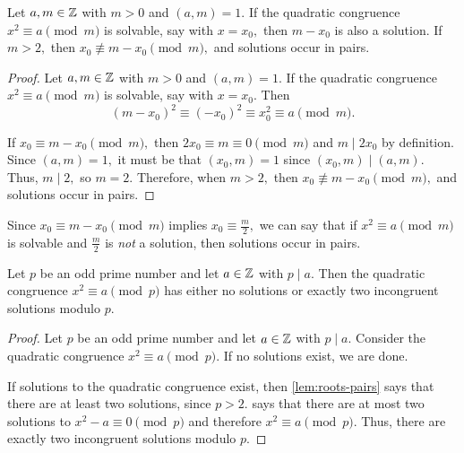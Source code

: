 \documentclass{ximera}
\begin{document}
\begin{lemma}\label{lem:roots-pairs}
    Let $a,m\in\mathbb Z$ with $m>0$ and $(a,m)=1.$ If the quadratic congruence $x^2\equiv a\pmod{m}$ is solvable, say with $x=x_0,$ then  $m-x_0$ is also a solution. If $m\gt 2,$ then $x_0\not\equiv m-x_0\pmod{m},$ and solutions occur in pairs.


    \begin{proof}
        Let $a,m\in\mathbb Z$ with $m>0$ and $(a,m)=1.$ If the quadratic congruence $x^2\equiv a\pmod{m}$ is solvable, say with $x=x_0.$ Then 
        \[(m-x_0)^2\equiv (-x_0)^2\equiv x_0^2\equiv a\pmod{m}.\]
        
        If $x_0\equiv m-x_0\pmod{m},$ then $2x_0\equiv m\equiv 0 \pmod{m}$ and $m\mid 2x_0$ by definition. Since $(a,m)=1,$ it must be that $(x_0,m)=1$ since $(x_0,m)\mid(a,m).$ Thus, $m\mid 2,$ so $m=2.$ Therefore, when  $m\gt 2,$ then $x_0\not\equiv m-x_0\pmod{m},$ and solutions occur in pairs.
    \end{proof}
\end{lemma}

\begin{remark}
    Since $x_0\equiv m-x_0\pmod{m}$ implies $x_0\equiv \frac{m}{2},$ we can say that if $x^2\equiv a\pmod{m}$ is solvable and $\frac{m}{2}$ is \emph{not} a solution, then solutions occur in pairs.
\end{remark}

\begin{proposition}\label{prop:number-sqrts}
    Let $p$ be an odd prime number and let $a\in\mathbb Z$ with $p\mid a.$ Then the quadratic congruence $x^2\equiv a\pmod{p}$ has either no solutions or exactly two incongruent solutions modulo $p$.


    \begin{proof}
        Let $p$ be an odd prime number and let $a\in\mathbb Z$ with $p\mid a.$ Consider the quadratic congruence $x^2\equiv a\pmod{p}.$ If no solutions exist, we are done.
        
        If solutions to the quadratic congruence exist, then \cref{lem:roots-pairs} says that there are at least two solutions, since $p>2.$  says that there are at most two solutions to $x^2-a\equiv 0\pmod{p}$ and therefore $x^2\equiv a\pmod{p}.$ Thus, there are exactly two incongruent solutions modulo $p.$
    \end{proof}
\end{proposition}
\end{document}
